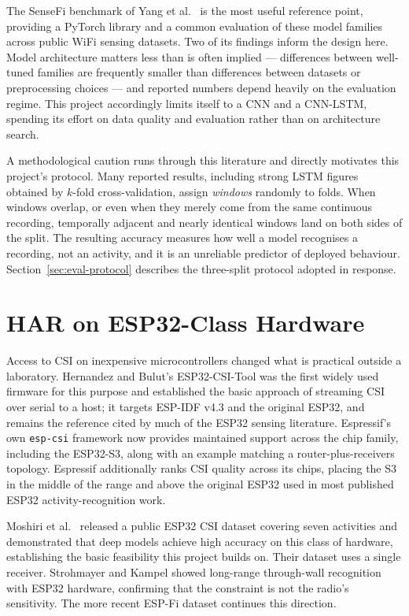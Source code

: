 The SenseFi benchmark of Yang et al.\ \cite{yang2023sensefi} is the most
useful reference point, providing a PyTorch library and a common evaluation
of these model families across public WiFi sensing datasets. Two of its
findings inform the design here. Model architecture matters less than is
often implied --- differences between well-tuned families are frequently
smaller than differences between datasets or preprocessing choices --- and
reported numbers depend heavily on the evaluation regime. This project
accordingly limits itself to a CNN and a CNN-LSTM, spending its effort on
data quality and evaluation rather than on architecture search.

A methodological caution runs through this literature and directly motivates
this project's protocol. Many reported results, including strong LSTM figures
obtained by $k$-fold cross-validation, assign \emph{windows} randomly to
folds. When windows overlap, or even when they merely come from the same
continuous recording, temporally adjacent and nearly identical windows land
on both sides of the split. The resulting accuracy measures how well a model
recognises a recording, not an activity, and it is an unreliable predictor of
deployed behaviour. Section~\ref{sec:eval-protocol} describes the three-split
protocol adopted in response.

\section{HAR on ESP32-Class Hardware}

Access to CSI on inexpensive microcontrollers changed what is practical
outside a laboratory. Hernandez and Bulut's ESP32-CSI-Tool was the first
widely used firmware for this purpose and established the basic approach of
streaming CSI over serial to a host; it targets ESP-IDF v4.3 and the original
ESP32, and remains the reference cited by much of the ESP32 sensing
literature. Espressif's own \texttt{esp-csi} framework \cite{espcsi} now
provides maintained support across the chip family, including the ESP32-S3,
along with an example matching a router-plus-receivers topology. Espressif
additionally ranks CSI quality across its chips, placing the S3 in the middle
of the range and above the original ESP32 used in most published ESP32
activity-recognition work.

Moshiri et al.\ \cite{moshiri2021csihar} released a public ESP32 CSI dataset
covering seven activities and demonstrated that deep models achieve high
accuracy on this class of hardware, establishing the basic feasibility this
project builds on. Their dataset uses a single receiver. Strohmayer and
Kampel \cite{strohmayer2023wall} showed long-range through-wall recognition
with ESP32 hardware, confirming that the constraint is not the radio's
sensitivity. The more recent ESP-Fi dataset \cite{espfi2026} continues this
direction.


